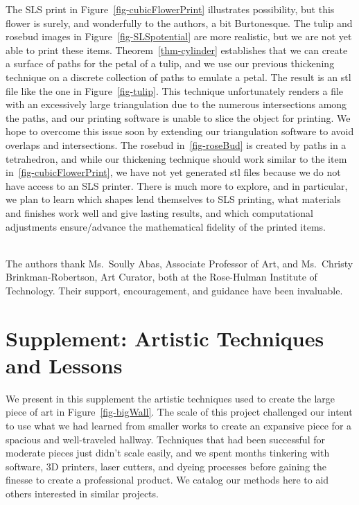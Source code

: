 \documentclass{article}
\begin{document}
The SLS print in Figure~\ref{fig-cubicFlowerPrint} illustrates possibility,
but this flower is surely, and wonderfully to the authors, a bit Burtonesque.
The tulip and rosebud images in Figure~\ref{fig-SLSpotential} are
more realistic, but we are not yet able to print these items. Theorem~\ref{thm-cylinder}
establishes that we can create a surface of paths for the petal of a tulip,
and we use our previous thickening technique on a discrete collection of paths to
emulate a petal. The result is an stl file like the one in Figure~\ref{fig-tulip}.
This technique unfortunately renders a file with an excessively large triangulation due
to the numerous intersections among the paths, and our printing software is unable
to slice the object for printing. We hope to overcome this issue soon by extending our 
triangulation software to avoid overlaps and intersections.
The rosebud in~\ref{fig-roseBud} is created by paths in a tetrahedron, and while our thickening 
technique should work similar to the item in~\ref{fig-cubicFlowerPrint}, we have not yet
generated stl files because we do not have access to an SLS printer. There is much more to explore, 
and in particular, we plan to learn which shapes lend themselves to SLS printing, what materials 
and finishes work well and give lasting results, and which computational adjustments ensure/advance
the mathematical fidelity of the printed items. \\\

 The authors thank Ms.~Soully Abas, Associate
Professor of Art, and Ms.~Christy Brinkman-Robertson, Art Curator, both at the
Rose-Hulman Institute of Technology. Their support, encouragement, and guidance
have been invaluable.




\newpage

\section*{Supplement: Artistic Techniques and Lessons}

We present in this supplement the artistic techniques used to create the large 
piece of art in Figure~\ref{fig-bigWall}. The scale of this project challenged our 
intent to use what we had learned from smaller works to create an expansive piece 
for a spacious and well-traveled hallway. Techniques that had been successful
for moderate pieces just didn't scale easily, and we spent months tinkering 
with software, 3D printers, laser cutters, and dyeing processes before gaining 
the finesse to create a professional product. We catalog our methods here
to aid others interested in similar projects.
\end{document}

